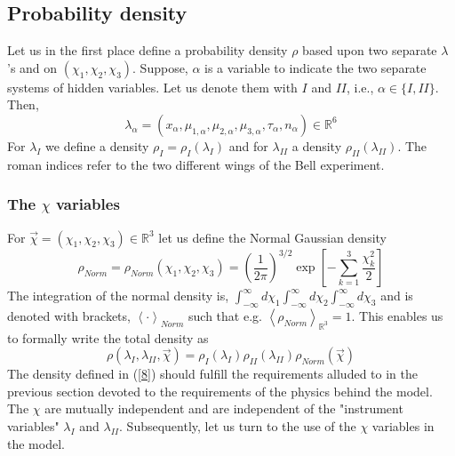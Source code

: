 \documentclass{appolb}
\begin{document}
\subsection{Probability density}\label{ProbDens}
Let us in the first place define a probability density $\rho$ based upon two separate $\lambda$'s and on $\left(\chi_1,\chi_2,\chi_3\right)$. Suppose, $\alpha$ is a variable to indicate the two separate systems of hidden variables. Let us denote them with $I$ and $II$, i.e., $\alpha \in \{I,II\}$. Then,
\begin{equation}\label{6}
\lambda_{\alpha}=\left(x_{\alpha},\mu_{1,\alpha},\mu_{2,\alpha},\mu_{3,\alpha}, \tau_{\alpha},n_{\alpha}\right)\in \mathbb{R}^6
\end{equation}
For $\lambda_{I}$ we define a density $\rho_{I}=\rho_{I}(\lambda_{I})$ and for $\lambda_{II}$ a density $\rho_{II}(\lambda_{II})$. The roman indices refer to the two different wings of the Bell experiment.
\subsubsection{The $\chi$ variables}
For $\vec{\chi}=\left(\chi_1,\chi_2,\chi_3\right)\in \mathbb{R}^3$ let us  define the Normal Gaussian density
\begin{equation}\label{7}
\rho_{Norm}=\rho_{Norm}\left(\chi_1,\chi_2,\chi_3\right)=\left(\frac{1}{2\pi}\right)^{3/2}\exp\left[ - \sum_{k=1}^3 \frac{\chi_k^2}{2}\right]
\end{equation}
The integration of the normal density is, $\int_{-\infty}^{\infty}d\chi_1\int_{-\infty}^{\infty}d\chi_2 \int_{-\infty}^{\infty}d\chi_3$ and is denoted with brackets, $\left\langle \cdot \right\rangle_{Norm}$ such that e.g. $\left\langle \rho_{Norm} \right\rangle_{\mathbb{R}^3}=1$. 
This enables us to formally write the total density as 
\begin{equation}\label{8}
\rho(\lambda_{I},\lambda_{II},\vec{\chi})=\rho_{I}(\lambda_{I})\rho_{II}(\lambda_{II})\rho_{Norm}(\vec{\chi})
\end{equation}
The density defined in (\ref{8}) should fulfill the requirements alluded to in the previous section devoted to the requirements of the physics behind the model. The $\chi$ are mutually independent and are independent of the "instrument variables" $\lambda_{I}$ and $\lambda_{II}$.
Subsequently, let us turn to the use of the $\chi $ variables in the model. 
\end{document}
